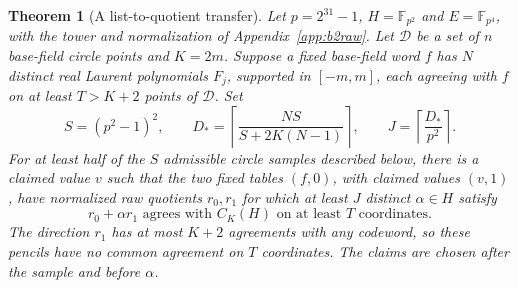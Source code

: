 \documentclass[11pt,letterpaper]{article}
\newtheorem{theorem}{Theorem}[section]
\theoremstyle{definition}
\theoremstyle{remark}
\begin{document}
\begin{theorem}[A list-to-quotient transfer]
Let $p=2^{31}-1$, $H=\mathbb F_{p^2}$ and $E=\mathbb F_{p^4}$,
with the tower and normalization of Appendix~\ref{app:b2raw}.
Let $\mathcal D$ be a set of $n$ base-field circle points and $K=2m$.
Suppose a fixed base-field word $f$ has $N$ distinct real Laurent
polynomials $F_j$, supported in $[-m,m]$, each agreeing with $f$
on at least $T>K+2$ points of $\mathcal D$.
Set
\[
 S=(p^2-1)^2,\qquad
 D_* =\left\lceil\frac{NS}{S+2K(N-1)}\right\rceil,\qquad
 J=\left\lceil\frac{D_*}{p^2}\right\rceil.
\]
For at least half of the $S$ admissible circle samples described below,
there is a claimed value $v$ such that the two fixed tables $(f,0)$,
with claimed values $(v,1)$, have normalized raw quotients $r_0,r_1$
for which at least $J$ distinct $\alpha\in H$ satisfy
\[
 r_0+\alpha r_1\text{ agrees with }C_K(H)
 \text{ on at least }T\text{ coordinates}.
\]
The direction $r_1$ has at most $K+2$ agreements with any codeword,
so these pencils have no common agreement on $T$ coordinates.
The claims are chosen after the sample and before $\alpha$.
\end{theorem}
\end{document}
